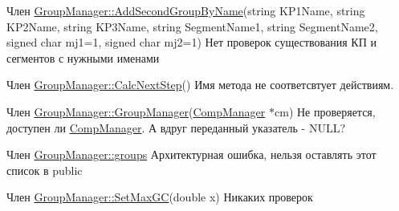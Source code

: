 \label{bug__bug000019}
\hypertarget{bug__bug000019}{}
 
\begin{DoxyDescription}
\item[Член \hyperlink{class_group_manager_ac9a283899c762a7b9d223068b49921d5}{GroupManager::AddSecondGroupByName}(string KP1Name, string KP2Name, string KP3Name, string SegmentName1, string SegmentName2, signed char mj1=1, signed char mj2=1) ]Нет проверок существования КП и сегментов с нужными именами 
\end{DoxyDescription}

\label{bug__bug000018}
\hypertarget{bug__bug000018}{}
 
\begin{DoxyDescription}
\item[Член \hyperlink{class_group_manager_a21932a91e45badc4247884883d8c91b0}{GroupManager::CalcNextStep}() ]Имя метода не соответсвтует действиям. 
\end{DoxyDescription}

\label{bug__bug000022}
\hypertarget{bug__bug000022}{}
 
\begin{DoxyDescription}
\item[Член \hyperlink{class_group_manager_ac7985f9186c573796ce0d6b693d1059c}{GroupManager::GroupManager}(\hyperlink{class_comp_manager}{CompManager} $\ast$cm) ]Не проверяется, доступен ли \hyperlink{class_comp_manager}{CompManager}. А вдруг переданный указатель -\/ NULL? 
\end{DoxyDescription}

\label{bug__bug000023}
\hypertarget{bug__bug000023}{}
 
\begin{DoxyDescription}
\item[Член \hyperlink{class_group_manager_ab8a15542235512daae8cdab78042d891}{GroupManager::groups} ]Архитектурная ошибка, нельзя оставлять этот список в public 
\end{DoxyDescription}

\label{bug__bug000020}
\hypertarget{bug__bug000020}{}
 
\begin{DoxyDescription}
\item[Член \hyperlink{class_group_manager_a2160abd085f628511331d8fb950ba226}{GroupManager::SetMaxGC}(double x) ]Никаких проверок 
\end{DoxyDescription}

\label{bug__bug000021}
\hypertarget{bug__bug000021}{}
 

